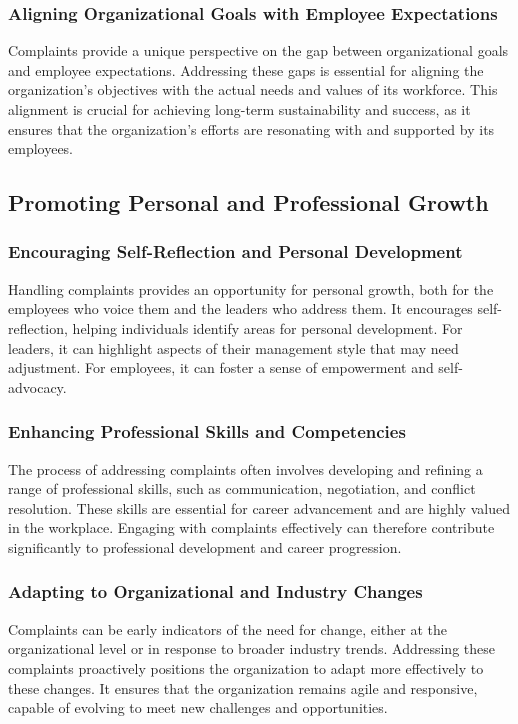 \documentclass[runningheads]{llncs}
\begin{document}
\subsubsection{Aligning Organizational Goals with Employee Expectations}
Complaints provide a unique perspective on the gap between organizational goals and employee expectations. Addressing these gaps is essential for aligning the organization’s objectives with the actual needs and values of its workforce. This alignment is crucial for achieving long-term sustainability and success, as it ensures that the organization's efforts are resonating with and supported by its employees.

\subsection{Promoting Personal and Professional Growth}
\subsubsection{Encouraging Self-Reflection and Personal Development}
Handling complaints provides an opportunity for personal growth, both for the employees who voice them and the leaders who address them. It encourages self-reflection, helping individuals identify areas for personal development. For leaders, it can highlight aspects of their management style that may need adjustment. For employees, it can foster a sense of empowerment and self-advocacy.
\subsubsection{Enhancing Professional Skills and Competencies}
The process of addressing complaints often involves developing and refining a range of professional skills, such as communication, negotiation, and conflict resolution. These skills are essential for career advancement and are highly valued in the workplace. Engaging with complaints effectively can therefore contribute significantly to professional development and career progression.
\subsubsection{Adapting to Organizational and Industry Changes}
Complaints can be early indicators of the need for change, either at the organizational level or in response to broader industry trends. Addressing these complaints proactively positions the organization to adapt more effectively to these changes. It ensures that the organization remains agile and responsive, capable of evolving to meet new challenges and opportunities.
\end{document}
